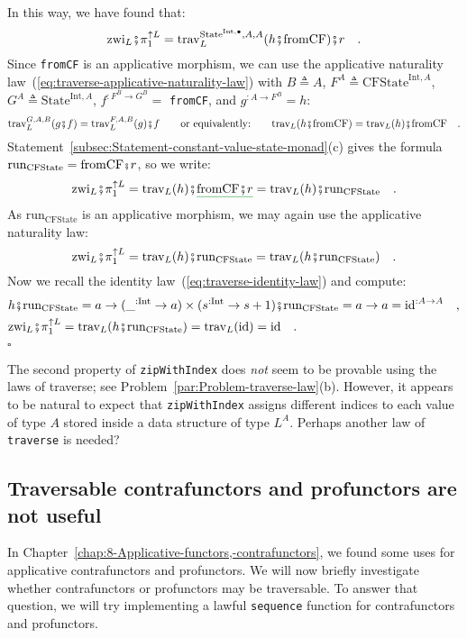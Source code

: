 In this way, we have found that:
\[
\text{zwi}_{L}\bef\pi_{1}^{\uparrow L}=\text{trav}_{L}^{\text{State}^{\text{Int},\bullet},A,A}(h\bef\text{fromCF})\bef r\quad.
\]
Since \lstinline!fromCF! is an applicative morphism, we can use the
applicative naturality law~(\ref{eq:traverse-applicative-naturality-law})
with $B\triangleq A$, $F^{A}\triangleq\text{CFState}^{\text{Int},A}$,
$G^{A}\triangleq\text{State}^{\text{Int},A}$, $f^{:F^{B}\rightarrow G^{B}}=$
\lstinline!fromCF!, and $g^{:A\rightarrow F^{B}}=h$:
\[
\text{trav}_{L}^{G,A,B}(g\bef f)=\text{trav}_{L}^{F,A,B}(g)\bef f\quad\quad\text{or equivalently:}\quad\quad\text{trav}_{L}(h\bef\text{fromCF})=\text{trav}_{L}(h)\bef\text{fromCF}\quad.
\]
Statement~\ref{subsec:Statement-constant-value-state-monad}(c) gives
the formula $\text{run}_{\text{CFState}}=\text{fromCF}\bef r$, so
we write:
\[
\text{zwi}_{L}\bef\pi_{1}^{\uparrow L}=\text{trav}_{L}(h)\bef\gunderline{\text{fromCF}\bef r}=\text{trav}_{L}(h)\bef\text{run}_{\text{CFState}}\quad.
\]
As $\text{run}_{\text{CFState}}$ is an applicative morphism, we may
again use the applicative naturality law:
\[
\text{zwi}_{L}\bef\pi_{1}^{\uparrow L}=\text{trav}_{L}(h)\bef\text{run}_{\text{CFState}}=\text{trav}_{L}(h\bef\text{run}_{\text{CFState}})\quad.
\]
Now we recall the identity law~(\ref{eq:traverse-identity-law})
and compute:
\begin{align*}
 & h\bef\text{run}_{\text{CFState}}=a\rightarrow(\_^{:\text{Int}}\rightarrow a)\times(s^{:\text{Int}}\rightarrow s+1)\bef\text{run}_{\text{CFState}}=a\rightarrow a=\text{id}^{:A\rightarrow A}\quad,\\
 & \text{zwi}_{L}\bef\pi_{1}^{\uparrow L}=\text{trav}_{L}(h\bef\text{run}_{\text{CFState}})=\text{trav}_{L}(\text{id})=\text{id}\quad.
\end{align*}
 $\square$

The second property of \lstinline!zipWithIndex! does \emph{not} seem
to be provable using the laws of traverse; see Problem~\ref{par:Problem-traverse-law}(b).
However, it appears to be natural to expect that \lstinline!zipWithIndex!
assigns different indices to each value of type $A$ stored inside
a data structure of type $L^{A}$. Perhaps another law of \lstinline!traverse!
is needed? 

\subsection{Traversable contrafunctors and profunctors are not useful}

In Chapter~\ref{chap:8-Applicative-functors,-contrafunctors}, we
found some uses for applicative contrafunctors and profunctors. We
will now briefly investigate whether contrafunctors or profunctors
may be traversable. To answer that question, we will try implementing
a lawful \lstinline!sequence! function for contrafunctors and profunctors.

